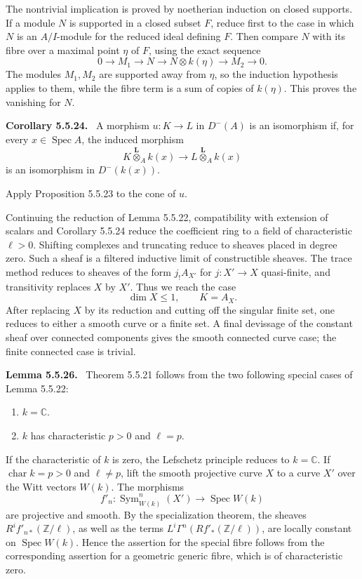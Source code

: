 \documentclass[12pt]{article}
\newcommand{\Zz}{\mathbb Z}
\newcommand{\C}{\mathbb C}
\DeclareMathOperator{\Spec}{Spec}
\DeclareMathOperator{\Sym}{Sym}
\newcommand{\otimesL}{\mathbin{\overset{\mathbf L}{\otimes}}}
\newenvironment{statement}[1]{\par\medskip\noindent\textbf{#1.}\ }{\par\medskip}
\begin{document}
The nontrivial implication is proved by noetherian induction on closed supports. If a module \(N\) is supported in a closed subset \(F\), reduce first to the case in which \(N\) is an \(A/I\)-module for the reduced ideal defining \(F\). Then compare \(N\) with its fibre over a maximal point \(\eta\) of \(F\), using the exact sequence
\[
0\to M_1\to N\to N\otimes k(\eta)\to M_2\to0.
\]
The modules \(M_1,M_2\) are supported away from \(\eta\), so the induction hypothesis applies to them, while the fibre term is a sum of copies of \(k(\eta)\). This proves the vanishing for \(N\).

\begin{statement}{Corollary 5.5.24}
A morphism \(u:K\to L\) in \(D^-(A)\) is an isomorphism if, for every \(x\in\Spec A\), the induced morphism
\[
K\otimesL_Ak(x)\longrightarrow L\otimesL_Ak(x)
\]
is an isomorphism in \(D^-(k(x))\).
\end{statement}

Apply Proposition 5.5.23 to the cone of \(u\).

Continuing the reduction of Lemma 5.5.22, compatibility with extension of scalars and Corollary 5.5.24 reduce the coefficient ring to a field of characteristic \(\ell>0\). Shifting complexes and truncating reduce to sheaves placed in degree zero. Such a sheaf is a filtered inductive limit of constructible sheaves. The trace method reduces to sheaves of the form \(j_!A_{X'}\) for \(j:X'\to X\) quasi-finite, and transitivity replaces \(X\) by \(X'\). Thus we reach the case
\[
\dim X\le1,
\qquad K=A_X.
\]
After replacing \(X\) by its reduction and cutting off the singular finite set, one reduces to either a smooth curve or a finite set. A final devissage of the constant sheaf over connected components gives the smooth connected curve case; the finite connected case is trivial.

\begin{statement}{Lemma 5.5.26}
Theorem 5.5.21 follows from the two following special cases of Lemma 5.5.22:
\begin{enumerate}[label=Case \arabic*.,leftmargin=3.3em]
\item \(k=\C\).
\item \(k\) has characteristic \(p>0\) and \(\ell=p\).
\end{enumerate}
\end{statement}

If the characteristic of \(k\) is zero, the Lefschetz principle reduces to \(k=\C\). If \(\operatorname{char} k=p>0\) and \(\ell\ne p\), lift the smooth projective curve \(X\) to a curve \(X'\) over the Witt vectors \(W(k)\). The morphisms
\[
f'_n:\Sym^n_{W(k)}(X')\longrightarrow\Spec W(k)
\]
are projective and smooth. By the specialization theorem, the sheaves \(R^if'_{n*}(\Zz/\ell)\), as well as the terms \(L^i\Gamma^n(Rf'_*(\Zz/\ell))\), are locally constant on \(\Spec W(k)\). Hence the assertion for the special fibre follows from the corresponding assertion for a geometric generic fibre, which is of characteristic zero.
\end{document}
